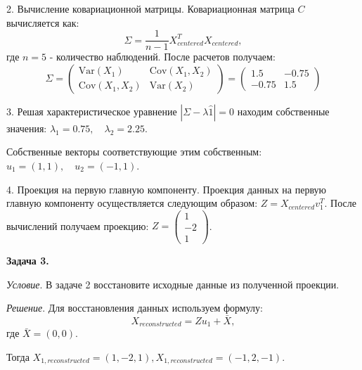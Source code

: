 2. Вычисление ковариационной матрицы. Ковариационная матрица $C$ вычисляется как:
\begin{equation}
    \Sigma = \frac{1}{n-1}X_{centered}^{T}X_{centered},
\end{equation}
где $n = 5$ - количество наблюдений.
После расчетов получаем:
\begin{equation}
    \Sigma = \begin{pmatrix} \text{Var}(X_1) & \text{Cov}(X_1, X_2) \\ \text{Cov}(X_1, X_2) & \text{Var}(X_2) \end{pmatrix} = \begin{pmatrix} 1.5 & -0.75 \\ -0.75 & 1.5 \end{pmatrix}
\end{equation}

3. Решая характеристическое уравнение $|\Sigma - \lambda \hat{1}| = 0$ находим собственные значения: $\lambda_1 = 0.75, \quad \lambda_2 = 2.25$.

Собственные векторы соответствующие этим собственным: $u_1 = (1, 1), \quad u_2 = (-1, 1)$.

4. Проекция на первую главную компоненту. Проекция данных на первую главную компоненту осуществляется следующим образом: $Z = X_{centered} v_1^T$. После вычислений получаем проекцию: $Z =\begin{pmatrix} 1 \\ -2 \\ 1 \end{pmatrix}$.

\textbf{Задача 3.}

\textit{Условие}. В задаче 2 восстановите исходные данные из полученной проекции.

\textit{Решение}. Для восстановления данных используем формулу:
\begin{equation}
    X_{reconstructed} = Zu_1 + \bar{X},
\end{equation}
где $\bar{X} = (0, 0)$.

Тогда $X_{1, reconstructed} = (1, -2, 1), X_{1, reconstructed} = (-1, 2, -1)$.


